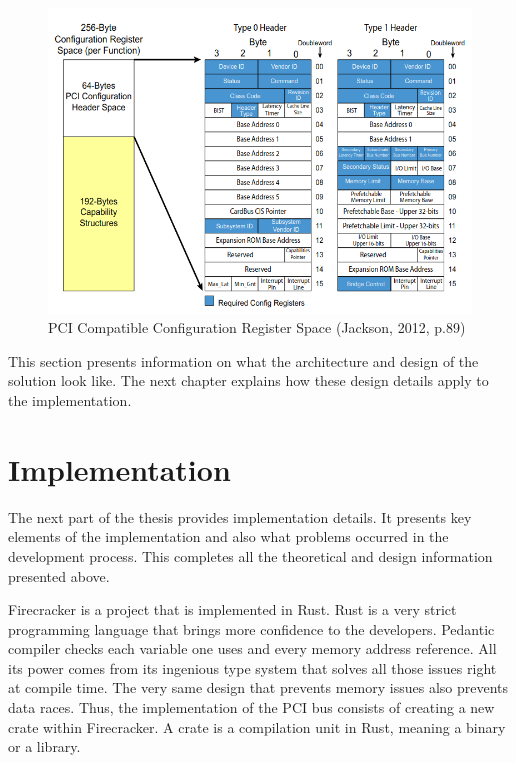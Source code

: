 \documentclass[12pt, a4paper]{report}
\begin{document}
\begin{figure}[H]
\centering
\includegraphics[width=\textwidth, keepaspectratio]{pics/pci-compatible-configuration-space.png}
  \caption{{PCI Compatible Configuration Register Space (Jackson, 2012, p.89)}\cite{book_pci_express}}
  \label{fig:pci-compatible-configuration-space}
\end{figure}

This section presents information on what the architecture and design of the solution look like. The next chapter explains how these design details apply to the implementation.


\chapter{Implementation}\label{Implementation}

The next part of the thesis provides implementation details. It presents key elements of the implementation and also what problems occurred in the development process. This completes all the theoretical and design information presented above.

Firecracker is a project that is implemented in Rust\cite{book_rust_programming}. Rust is a very strict programming language that brings more confidence to the developers. Pedantic compiler checks each variable one uses and every memory address reference. All its power comes from its ingenious type system that solves all those issues right at compile time. The very same design that prevents memory issues also prevents data races\footnotemark. Thus, the implementation of the PCI bus consists of creating a new crate within Firecracker. A crate is a compilation unit in Rust, meaning a binary or a library.
\end{document}
